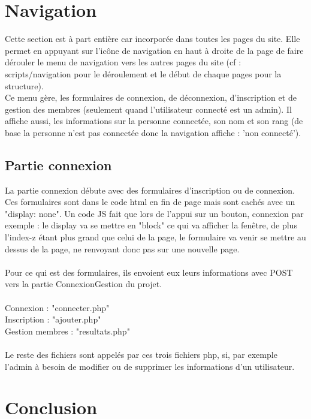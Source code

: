 \documentclass{article}
\begin{document}
\section{Navigation}

Cette section est à part entière car incorporée dans toutes les pages du site. Elle permet en appuyant sur l'icône de navigation en haut à droite de la page de faire dérouler le menu de navigation vers les autres pages du site (cf : scripts/navigation pour le déroulement et le début de chaque pages pour la structure).\\

Ce menu gère, les formulaires de connexion, de déconnexion, d'inscription et de gestion des membres (seulement quand l'utilisateur connecté est un admin). Il affiche aussi, les informations sur la personne connectée, son nom et son rang (de base la personne n'est pas connectée donc la navigation affiche : 'non connecté').

\subsection{Partie connexion}

La partie connexion débute avec des formulaires d'inscription ou de connexion. Ces formulaires sont dans le code html en fin de page mais sont cachés avec un "display: none". Un code JS fait que lors de l'appui sur un bouton, connexion par exemple : le display va se mettre en "block" ce qui va afficher la fenêtre, de plus l'index-z étant plus grand que celui de la page, le formulaire va venir se mettre au dessus de la page, ne renvoyant donc pas sur une nouvelle page.
\\
\\
Pour ce qui est des formulaires, ils envoient eux leurs informations avec POST vers la partie ConnexionGestion du projet. \\ \\
Connexion : "connecter.php" \\
Inscription : "ajouter.php" \\
Gestion membres : "resultats.php" \\ \\
Le reste des fichiers sont appelés par ces trois fichiers php, si, par exemple l'admin à besoin de modifier ou de supprimer les informations d'un utilisateur.

\section{Conclusion}
\end{document}
